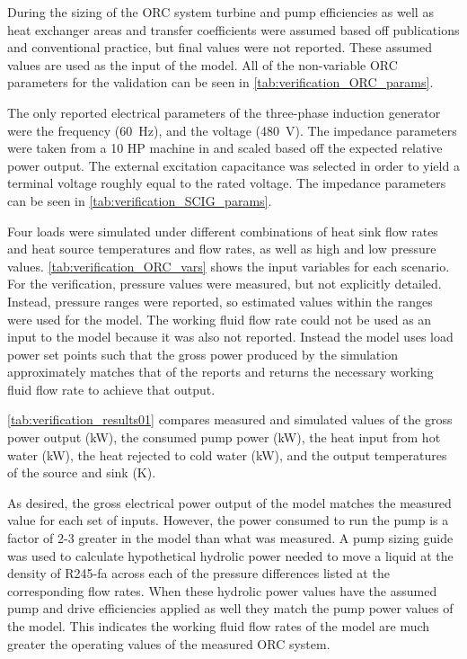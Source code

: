 During the sizing of the ORC system turbine and pump efficiencies as well as heat exchanger areas and transfer coefficients were assumed based off publications and conventional practice, but final values were not reported. These assumed values are used as the input of the model. All of the non-variable ORC parameters for the validation can be seen in \autoref{tab:verification_ORC_params}.


The only reported electrical parameters of the three-phase induction generator were the frequency (\SI{60}{\hertz}), and the voltage (\SI{480}{\volt}). The impedance parameters were taken from a 10 HP machine in \cite{Ouazenne1983} and scaled based off the expected relative power output. The external excitation capacitance was selected in order to yield a terminal voltage roughly equal to the rated voltage. The impedance parameters can be seen in \autoref{tab:verification_SCIG_params}.

%

Four loads were simulated under different combinations of heat sink flow rates and heat source temperatures and flow rates, as well as high and low pressure values. \autoref{tab:verification_ORC_vars} shows the input variables for each scenario. For the verification, pressure values were measured, but not explicitly detailed. Instead, pressure ranges were reported, so estimated values within the ranges were used for the model. The working fluid flow rate could not be used as an input to the model because it was also not reported. Instead the model uses load power set points such that the gross power produced by the simulation approximately matches that of the reports and returns the necessary working fluid flow rate to achieve that output.  


\autoref{tab:verification_results01} compares measured and simulated values of the gross power output (\si{\kilo\watt}), the consumed pump power (\si{\kilo\watt}), the heat input from hot water (\si{\kilo\watt}), the heat rejected to cold water (\si{\kilo\watt}), and the output temperatures of the source and sink (\si{\kelvin}). 


As desired, the gross electrical power output of the model matches the measured value for each set of inputs. However, the power consumed to run the pump is a factor of 2-3 greater in the model than what was measured. A pump sizing guide \cite{CheGuide2017} was used to calculate hypothetical hydrolic power needed to move a liquid at the density of R245-fa across each of the pressure differences listed at the corresponding flow rates. When these hydrolic power values have the assumed pump and drive efficiencies applied as well they match the pump power values of the model. This indicates the working fluid flow rates of the model are much greater the operating values of the measured ORC system.

